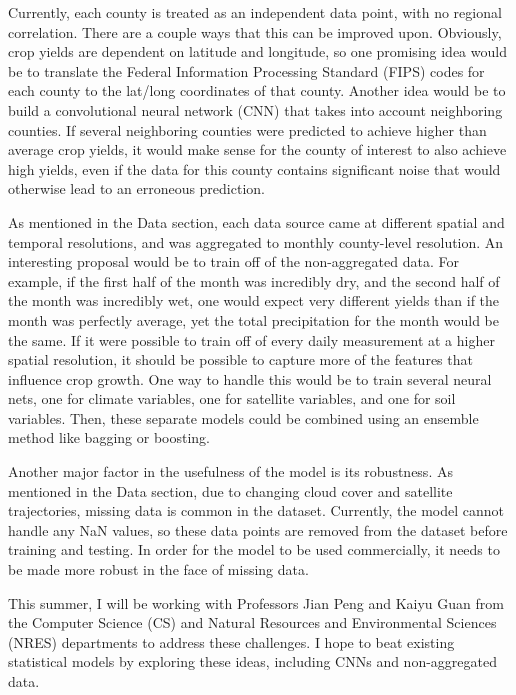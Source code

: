 \documentclass[letterpaper]{article}
\begin{document}
Currently, each county is treated as an independent data point, with no regional correlation. There are a couple ways that this can be improved upon. Obviously, crop yields are dependent on latitude and longitude, so one promising idea would be to translate the Federal Information Processing Standard (FIPS) codes for each county to the lat/long coordinates of that county. Another idea would be to build a convolutional neural network (CNN) that takes into account neighboring counties. If several neighboring counties were predicted to achieve higher than average crop yields, it would make sense for the county of interest to also achieve high yields, even if the data for this county contains significant noise that would otherwise lead to an erroneous prediction.

As mentioned in the Data section, each data source came at different spatial and temporal resolutions, and was aggregated to monthly county-level resolution. An interesting proposal would be to train off of the non-aggregated data. For example, if the first half of the month was incredibly dry, and the second half of the month was incredibly wet, one would expect very different yields than if the month was perfectly average, yet the total precipitation for the month would be the same. If it were possible to train off of every daily measurement at a higher spatial resolution, it should be possible to capture more of the features that influence crop growth. One way to handle this would be to train several neural nets, one for climate variables, one for satellite variables, and one for soil variables. Then, these separate models could be combined using an ensemble method like bagging or boosting.

Another major factor in the usefulness of the model is its robustness. As mentioned in the Data section, due to changing cloud cover and satellite trajectories, missing data is common in the dataset. Currently, the model cannot handle any NaN values, so these data points are removed from the dataset before training and testing. In order for the model to be used commercially, it needs to be made more robust in the face of missing data.

This summer, I will be working with Professors Jian Peng and Kaiyu Guan from the Computer Science (CS) and Natural Resources and Environmental Sciences (NRES) departments to address these challenges. I hope to beat existing statistical models by exploring these ideas, including CNNs and non-aggregated data.



\end{document}
